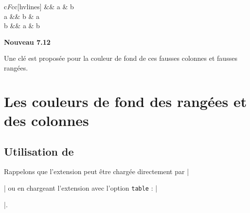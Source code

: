 \documentclass[dvipsnames]{article}
\begin{document}
\medskip
\begin{Code}[width=10cm,show-output]
\begin{NiceTabular}{c\emph{F}cc}[hvlines]
\CodeBefore
\Body
{} && a & b \\
\emph{\FalseRow}
a              && b & a \\
b              && a & b
\end{NiceTabular}
\end{Code}

\bigskip
{}
\colorbox{yellow!50}{\textbf{Nouveau 7.12}}

\smallskip
\nobreak
Une clé  est proposée pour la couleur de fond de ces
fausses colonnes et fausses rangées.

  

\section{Les couleurs de fond des rangées et des colonnes}


\subsection{Utilisation de \texorpdfstring{}{colortbl}}


Rappelons que l'extension  peut être chargée directement par
|\usepackage{colortbl}| ou en chargeant l'extension  avec l'option
\texttt{table} : |\usepackage[table]{xcolor}|.
\end{document}
